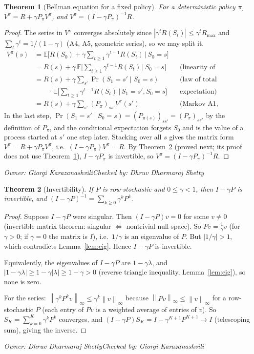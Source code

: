 \documentclass[10pt]{article}
\newtheorem{theorem}{Theorem}
\theoremstyle{definition}
\newcommand{\GK}{Giorgi Karazanashvili}
\newcommand{\DS}{Dhruv Dharmaraj Shetty}
\newcommand{\signoff}[2]{\par\smallskip\hfill\emph{Owner: #1}\qquad\emph{Checked by: #2}\par\medskip}
\newcommand{\E}{\mathbb{E}}
\newcommand{\norm}[1]{\left\lVert #1\right\rVert_\infty}
\begin{document}
\begin{theorem}[Bellman equation for a fixed policy]\label{thm:bellman}
For a deterministic policy $\pi$, $V^\pi = R+\gamma P_\pi V^\pi$, and $V^\pi = (I-\gamma P_\pi)^{-1}R$.
\end{theorem}
\begin{proof}
The series in $V^\pi$ converges absolutely since $|\gamma^tR(S_t)|\le\gamma^tR_{\max}$ and $\sum_t\gamma^t = 1/(1-\gamma)$ (A4, A5, geometric series), so we may split it.
\begin{align*}
V^\pi(s) &= \E\Big[R(S_0) + \gamma\sum_{t\ge1}\gamma^{t-1}R(S_t)\,\Big|\,S_0 = s\Big]\\
&= R(s) + \gamma\,\E\Big[\sum_{t\ge1}\gamma^{t-1}R(S_t)\,\Big|\,S_0=s\Big] && \text{(linearity of expectation)}\\
&= R(s) + \gamma\sum_{s'}\Pr(S_1 = s'\mid S_0 = s) && \text{(law of total}\\
&\qquad\cdot\,\E\Big[\sum_{t\ge1}\gamma^{t-1}R(S_t)\,\Big|\,S_1 = s', S_0 = s\Big] && \text{expectation)}\\
&= R(s) + \gamma\sum_{s'}(P_\pi)_{ss'}V^\pi(s') && \text{(Markov A1, stationarity A2).}
\end{align*}
In the last step, $\Pr(S_1 = s'\mid S_0 = s) = (P_{\pi(s)})_{ss'} = (P_\pi)_{ss'}$ by the definition of $P_\pi$, and the conditional expectation forgets $S_0$ and is the value of a process started at $s'$ one step later. Stacking over all $s$ gives the matrix form $V^\pi = R+\gamma P_\pi V^\pi$, i.e.\ $(I-\gamma P_\pi)V^\pi = R$. By Theorem~\ref{thm:inv} (proved next; its proof does not use Theorem~\ref{thm:bellman}), $I-\gamma P_\pi$ is invertible, so $V^\pi = (I-\gamma P_\pi)^{-1}R$.
\end{proof}
\signoff{\GK}{\DS}

\begin{theorem}[Invertibility]\label{thm:inv}
If $P$ is row-stochastic and $0\le\gamma<1$, then $I-\gamma P$ is invertible, and $(I-\gamma P)^{-1} = \sum_{k\ge0}\gamma^kP^k$.
\end{theorem}
\begin{proof}
Suppose $I-\gamma P$ were singular. Then $(I-\gamma P)v = 0$ for some $v\ne0$ (invertible matrix theorem: singular $\Leftrightarrow$ nontrivial null space). So $Pv = \frac1\gamma v$ (for $\gamma>0$; if $\gamma = 0$ the matrix is $I$), i.e.\ $1/\gamma$ is an eigenvalue of $P$. But $|1/\gamma|>1$, which contradicts Lemma~\ref{lem:eig}. Hence $I-\gamma P$ is invertible.

Equivalently, the eigenvalues of $I-\gamma P$ are $1-\gamma\lambda$, and $|1-\gamma\lambda|\ge 1-\gamma|\lambda|\ge 1-\gamma>0$ (reverse triangle inequality, Lemma~\ref{lem:eig}), so none is zero.

For the series: $\norm{\gamma^kP^kv}\le\gamma^k\norm{v}$ because $\norm{Pv}\le\norm{v}$ for a row-stochastic $P$ (each entry of $Pv$ is a weighted average of entries of $v$). So $S_K = \sum_{k=0}^K\gamma^kP^k$ converges, and $(I-\gamma P)S_K = I-\gamma^{K+1}P^{K+1}\to I$ (telescoping sum), giving the inverse.
\end{proof}
\signoff{\DS}{\GK}
\end{document}
